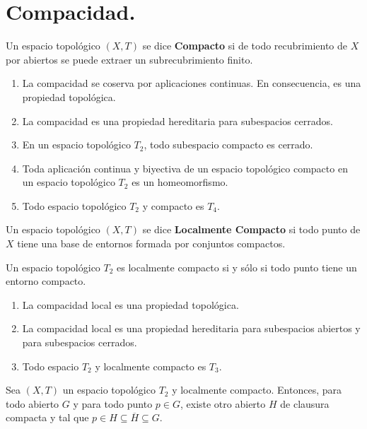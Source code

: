 \documentclass[cursovd_portada.tex]{subfiles}
\begin{document}
\section{Compacidad.}
\begin{defi}
Un espacio topol\'{o}gico $(X,T)$ se dice {\bf Compacto} si de todo recubrimiento de $X$ por abiertos se puede extraer
un subrecubrimiento finito.
\end{defi}
\begin{prop}
\begin{enumerate}
\item La compacidad se coserva por aplicaciones continuas. En consecuencia, es una propiedad topol\'{o}gica.
\item La compacidad es una propiedad hereditaria para subespacios cerrados.
\item En un espacio topol\'{o}gico $T_2$, todo subespacio compacto es cerrado.
\item Toda aplicaci\'{o}n continua y biyectiva de un espacio topol\'{o}gico compacto en un espacio topol\'{o}gico $T_2$ es un
homeomorfismo.
\item Todo espacio topol\'{o}gico $T_2$ y compacto es $T_4$.
\end{enumerate}
\end{prop}
\begin{defi}
Un espacio topol\'{o}gico $(X,T)$ se dice {\bf Localmente Compacto} si todo punto de $X$ tiene una base de entornos
formada por conjuntos compactos.
\end{defi}
\begin{teorema}
Un espacio topol\'{o}gico $T_2$ es localmente compacto si y s\'{o}lo si todo punto tiene un entorno compacto.
\end{teorema}
\begin{prop}
\begin{enumerate}
\item La compacidad local es una propiedad topol\'{o}gica.
\item La compacidad local es una propiedad hereditaria para subespacios abiertos y para subespacios cerrados.
\item Todo espacio $T_2$ y localmente compacto es $T_3$.
\end{enumerate}
\end{prop}
\begin{prop}
Sea $(X,T)$ un espacio topol\'{o}gico $T_2$ y localmente compacto. Entonces, para todo abierto $G$ y para todo punto
$p\in G$, existe otro abierto $H$ de clausura compacta y tal que $p\in H\subseteq\overline{H}\subseteq G$.
\end{prop}
\end{document}
